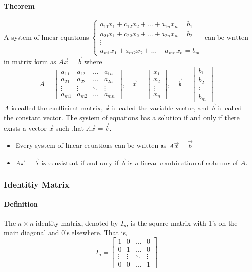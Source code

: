 \paragraph*{Theorem}
A system of linear equations $\begin{cases}
a_{11}x_1 + a_{12}x_2 + \ldots + a_{1n}x_n = b_1 \\
a_{21}x_1 + a_{22}x_2 + \ldots + a_{2n}x_n = b_2 \\
\vdots \\
a_{m1}x_1 + a_{m2}x_2 + \ldots + a_{mn}x_n = b_m
\end{cases}$ can be written in matrix form as $A\vec{x} = \vec{b}$ where
\[A = \begin{bmatrix}
    a_{11} & a_{12} & \ldots & a_{1n} \\
    a_{21} & a_{22} & \ldots & a_{2n} \\
    \vdots & \vdots & \ddots & \vdots \\
    a_{m1} & a_{m2} & \ldots & a_{mn}
\end{bmatrix}, \quad \vec{x} = \begin{bmatrix}
    x_1 \\
    x_2 \\
    \vdots \\
    x_n
\end{bmatrix}, \quad \vec{b} = \begin{bmatrix}
    b_1 \\
    b_2 \\
    \vdots \\
    b_m
\end{bmatrix}\] 
$A$ is called the coefficient matrix, $\vec{x}$ is called the variable vector, and $\vec{b}$ is called the constant vector. The system of equations has a solution if and only if there exists a vector $\vec{x}$ such that $A\vec{x} = \vec{b}$.
\begin{itemize}
    \item Every system of linear equations can be written as $A\vec{x} = \vec{b}$ 
    \item $A\vec{x} = \vec{b}$ is consistant if and only if $\vec{b}$ is a linear combination of columns of $A$.
\end{itemize}

\subsubsection*{Identitiy Matrix}
\paragraph*{Definition}
The $n \times n$ identity matrix, denoted by $I_n$, is the square matrix with 1's on the main diagonal and 0's elsewhere. That is,
\[I_n = \begin{bmatrix}
    1 & 0 & \ldots & 0 \\
    0 & 1 & \ldots & 0 \\
    \vdots & \vdots & \ddots & \vdots \\
    0 & 0 & \ldots & 1
\end{bmatrix}\]

